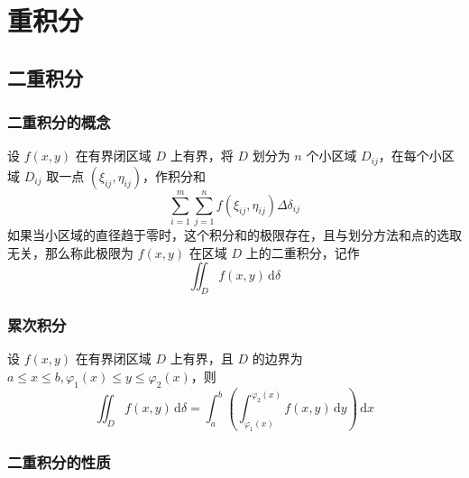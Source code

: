 \chapter{重积分}

\section{二重积分}

\subsection{二重积分的概念}

\begin{definition}
    设 $f(x,y)$ 在有界闭区域 $D$ 上有界，将 $D$ 划分为 $n$ 个小区域 $D_{ij}$，在每个小区域 $D_{ij}$ 取一点 $(\xi_{ij},\eta_{ij})$，作积分和
    \[
        \sum_{i=1}^{m} \sum_{j=1}^{n} f(\xi_{ij},\eta_{ij}) \Delta \delta_{ij}
    \]
    如果当小区域的直径趋于零时，这个积分和的极限存在，且与划分方法和点的选取无关，那么称此极限为 $f(x,y)$ 在区域 $D$ 上的二重积分，记作
    \[
        \iint_{D} f(x,y) \, \mathrm{d}\delta
    \]
\end{definition}

\subsection{累次积分}

\begin{theorem}
    设 $f(x,y)$ 在有界闭区域 $D$ 上有界，且 $D$ 的边界为 $a \leq x \leq b, \varphi_{1}(x) \leq y \leq \varphi_{2}(x)$，则
    \[
        \iint_{D} f(x,y) \, \mathrm{d}\delta = \int_{a}^{b} \left( \int_{\varphi_{1}(x)}^{\varphi_{2}(x)} f(x,y) \, \mathrm{d}y \right) \, \mathrm{d}x
    \]
\end{theorem}

\subsection{二重积分的性质}

